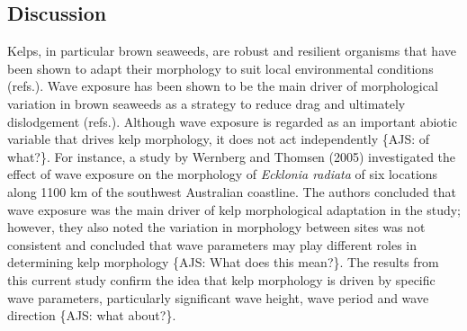 \documentclass[10pt,a4,]{article}
\begin{document}
\newpage

\hypertarget{discussion}{%
\subsection{Discussion}\label{discussion}}

Kelps, in particular brown seaweeds, are robust and resilient organisms
that have been shown to adapt their morphology to suit local
environmental conditions (refs.). Wave exposure has been shown to be the
main driver of morphological variation in brown seaweeds as a strategy
to reduce drag and ultimately dislodgement (refs.). Although wave
exposure is regarded as an important abiotic variable that drives kelp
morphology, it does not act independently \{AJS: of what?\}. For
instance, a study by Wernberg and Thomsen (2005) investigated the effect
of wave exposure on the morphology of \emph{Ecklonia radiata} of six
locations along 1100 km of the southwest Australian coastline. The
authors concluded that wave exposure was the main driver of kelp
morphological adaptation in the study; however, they also noted the
variation in morphology between sites was not consistent and concluded
that wave parameters may play different roles in determining kelp
morphology \{AJS: What does this mean?\}. The results from this current
study confirm the idea that kelp morphology is driven by specific wave
parameters, particularly significant wave height, wave period and wave
direction \{AJS: what about?\}.
\end{document}
